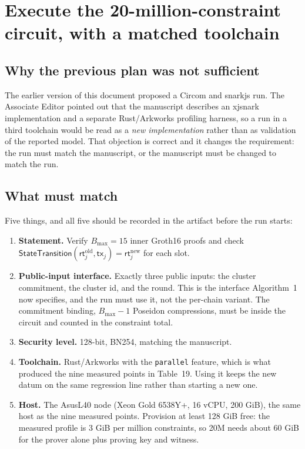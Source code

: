 \documentclass[11pt,a4paper]{article}
\begin{document}
\section{Execute the 20-million-constraint circuit, with a matched toolchain}
\label{sec:todo-20m}

\subsection*{Why the previous plan was not sufficient}

The earlier version of this document proposed a Circom and snarkjs run. The
Associate Editor pointed out that the manuscript describes an xjsnark
implementation and a separate Rust/Arkworks profiling harness, so a run in a
third toolchain would be read as a \emph{new implementation} rather than as
validation of the reported model. That objection is correct and it changes the
requirement: the run must match the manuscript, or the manuscript must be
changed to match the run.

\subsection*{What must match}

Five things, and all five should be recorded in the artifact before the run
starts:

\begin{enumerate}[leftmargin=*,itemsep=3pt]
  \item \textbf{Statement.} Verify $B_{\max}=15$ inner Groth16 proofs and check
  $\mathsf{StateTransition}(\mathsf{rt}^{\mathrm{old}}_j,\mathsf{tx}_j)=
  \mathsf{rt}^{\mathrm{new}}_j$ for each slot.
  \item \textbf{Public-input interface.} Exactly three public inputs: the
  cluster commitment, the cluster id, and the round. This is the interface
  Algorithm~1 now specifies, and the run must use it, not the per-chain variant.
  The commitment binding, $B_{\max}-1$ Poseidon compressions, must be inside
  the circuit and counted in the constraint total.
  \item \textbf{Security level.} 128-bit, BN254, matching the manuscript.
  \item \textbf{Toolchain.} Rust/Arkworks with the \texttt{parallel} feature,
  which is what produced the nine measured points in Table~19. Using it keeps
  the new datum on the same regression line rather than starting a new one.
  \item \textbf{Host.} The AsusL40 node (Xeon Gold 6538Y+, 16 vCPU, 200 GiB),
  the same host as the nine measured points. Provision at least 128 GiB free:
  the measured profile is 3 GiB per million constraints, so 20M needs about
  60 GiB for the prover alone plus proving key and witness.
\end{enumerate}
\end{document}
